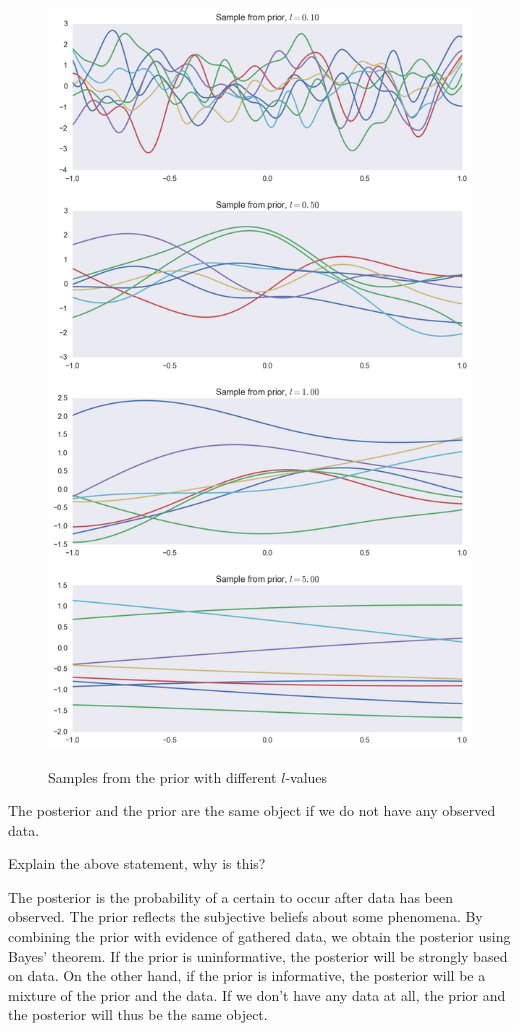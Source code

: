 \documentclass[12pt]{article}
\newenvironment{question}[2][Question]{\begin{trivlist}
\kern10pt
\item[\hskip \labelsep {\bfseries #1}\hskip \labelsep {\bfseries #2.}]}{\end{trivlist}}
\newcommand*{\answer}{%
  \par
  \kern1pt
  \begingroup
    \centering
    \raisebox{.2\baselineskip}{%
      \textcolor{gray}{
	    \rule{.6667\linewidth}{.1pt}%
      }
    }%
    \par
  \kern8pt
  \endgroup
}
\begin{document}
\begin{question}{12}
\begin{figure}
\caption{Samples from the prior with different $l$-values}
\includegraphics[scale=0.6]{l_values}
\centering
\label{l_values}
\end{figure}

\end{question}

\begin{question}{13}
The posterior and the prior are the same object if we do not have any observed data.

Explain the above statement, why is this?

\answer

The posterior is the probability of a certain to occur after data has been observed. The prior reflects the subjective beliefs about some phenomena. By combining the prior with evidence of gathered data, we obtain the posterior using Bayes' theorem. If the prior is uninformative, the posterior will be strongly based on data. On the other hand, if the prior is informative, the posterior will be a mixture of the prior and the data. If we don't have any data at all, the prior and the posterior will thus be the same object.
\end{question}
\end{document}

